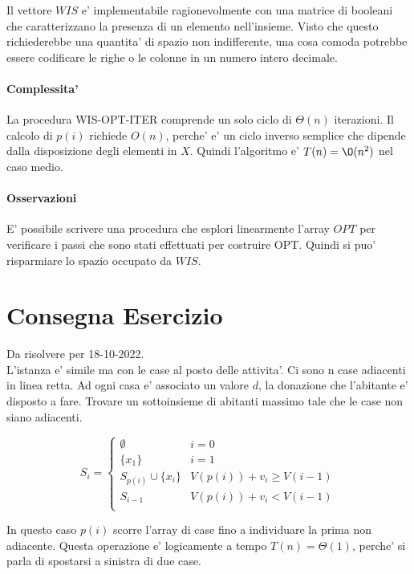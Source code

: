 Il vettore $WIS$ e' implementabile ragionevolmente con una matrice di booleani che caratterizzano la presenza di un elemento nell'insieme. Visto che questo richiederebbe una quantita' di spazio non indifferente, una cosa comoda potrebbe essere codificare le righe o le colonne in un numero intero decimale.

\paragraph{Complessita'}

La procedura WIS-OPT-ITER comprende un solo ciclo di $\Theta(n)$ iterazioni.
Il calcolo di $p(i)$ richiede $O(n)$, perche' e' un ciclo inverso semplice che dipende dalla disposizione degli elementi in $X$.
Quindi l'algoritmo e' $T(n) = \O(n^2)$ nel caso medio.

\paragraph{Osservazioni}

E' possibile scrivere una procedura che esplori linearmente l'array $OPT$ per verificare i passi che sono stati effettuati per costruire OPT. Quindi si puo' risparmiare lo spazio occupato da $WIS$.

\section{Consegna Esercizio}
Da risolvere per 18-10-2022. \\

L'istanza e' simile ma con le case al posto delle attivita'.
Ci sono n case adiacenti in linea retta.
Ad ogni casa e' associato un valore $d$, la donazione che l'abitante e' disposto a fare.
Trovare un sottoinsieme di abitanti massimo tale che le case non siano adiacenti.

\[
    S_i =
    \begin{cases}
        \text{$\emptyset$} & \text{$i = 0$} \\
        \text{$\{x_1\}$} & \text{$i = 1$} \\
        \text{$S_{p(i)} \cup \{x_i\}$} & \text{$V(p(i)) + v_i \geq V(i-1)$} \\
        \text{$S_{i-1}$} & \text{$V(p(i)) + v_i < V(i-1)$} \\
    \end{cases}
\]

In questo caso $p(i)$ scorre l'array di case fino a individuare la prima non adiacente.
Questa operazione e' logicamente a tempo $T(n) = \Theta(1)$, perche' si parla di spostarsi a sinistra di due case.

